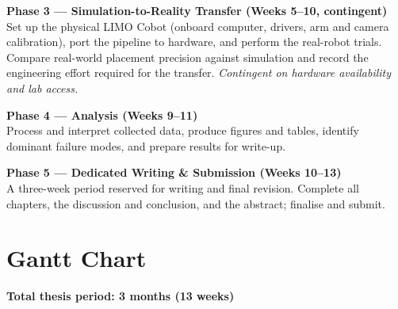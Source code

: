 \documentclass[11pt,a4paper]{article}
\begin{document}
\vspace{0.5em}

\noindent\textbf{Phase 3 — Simulation-to-Reality Transfer (Weeks 5–10, contingent)}\\
Set up the physical LIMO Cobot (onboard computer, drivers, arm and camera calibration),
port the pipeline to hardware, and perform the real-robot trials.
Compare real-world placement precision against simulation and record the engineering
effort required for the transfer.
\textit{Contingent on hardware availability and lab access.}

\vspace{0.5em}

\noindent\textbf{Phase 4 — Analysis (Weeks 9–11)}\\
Process and interpret collected data, produce figures and tables, identify dominant
failure modes, and prepare results for write-up.

\vspace{0.5em}

\noindent\textbf{Phase 5 — Dedicated Writing \& Submission (Weeks 10–13)}\\
A three-week period reserved for writing and final revision.
Complete all chapters, the discussion and conclusion, and the abstract;
finalise and submit.

\newpage

\section{Gantt Chart}

\textbf{Total thesis period: 3 months (13 weeks)}

\vspace{1em}
\end{document}
